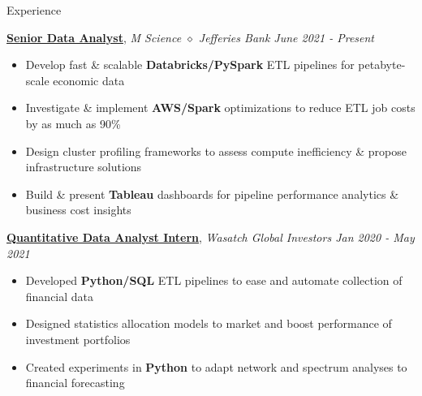 \documentclass{resume/resume}
\begin{document}
\begin{rSection}{Experience}

    \href{https://mscience.com/}{\bf Senior Data Analyst}, {\em M Science $\diamond$ Jefferies Bank \hfill June 2021 - Present}
    \vspace{-6pt}
    \begin{itemize}[nosep]
        \item Develop fast \& scalable {\bf Databricks/PySpark} ETL pipelines for petabyte-scale economic data
        \item Investigate \& implement {\bf AWS/Spark} optimizations to reduce ETL job costs by as much as 90\%
        \item Design cluster profiling frameworks to assess compute inefficiency \& propose infrastructure solutions
        \item Build \& present {\bf Tableau} dashboards for pipeline performance analytics \& business cost insights
    \end{itemize}

    \href{https://wasatchglobal.com/}{\bf Quantitative Data Analyst Intern}, {\em Wasatch Global Investors \hfill Jan 2020 - May 2021}
    \vspace{-6pt}
    \begin{itemize}[nosep]
        \item Developed {\bf Python/SQL} ETL pipelines to ease and automate collection of financial data
        \item Designed statistics allocation models to market and boost performance of investment portfolios
        \item Created experiments in {\bf Python} to adapt network and spectrum analyses to financial forecasting
    \end{itemize}


\end{rSection}
\end{document}
